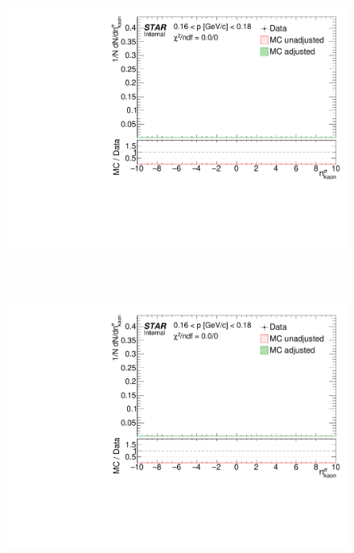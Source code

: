 \begin{figure}[t!]
\ContinuedFloat%
\centering%
\parbox{0.495\textwidth}{
  \centering
  \includegraphics[width=\linewidth,page=40]{graphics/dedx/nSigmaKaon_DataVsMC.pdf}~\\[530pt]

}~
\parbox{0.495\textwidth}{
  \centering
  \includegraphics[width=\linewidth,page=41]{graphics/dedx/nSigmaKaon_DataVsMC.pdf}~\\[530pt]
}%
\end{figure}
% 
% 
% 
% 
% 
% 
% 
% 
% 
% 
% 
% 
% 
%
\clearpage
